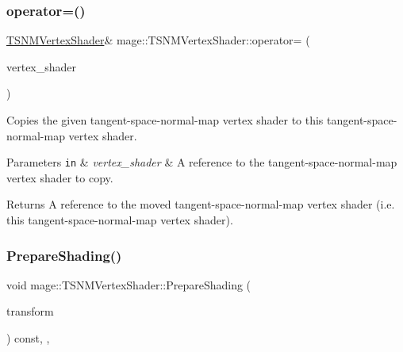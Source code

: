 \subsubsection{\texorpdfstring{operator=()}{operator=()}\hspace{0.1cm}{\footnotesize\ttfamily [2/2]}}
{\footnotesize\ttfamily \hyperlink{classmage_1_1_t_s_n_m_vertex_shader}{T\+S\+N\+M\+Vertex\+Shader}\& mage\+::\+T\+S\+N\+M\+Vertex\+Shader\+::operator= (\begin{DoxyParamCaption}\item[{\hyperlink{classmage_1_1_t_s_n_m_vertex_shader}{T\+S\+N\+M\+Vertex\+Shader} \&\&}]{vertex\+\_\+shader }\end{DoxyParamCaption})\hspace{0.3cm}{\ttfamily [delete]}}

Copies the given tangent-\/space-\/normal-\/map vertex shader to this tangent-\/space-\/normal-\/map vertex shader.


\begin{DoxyParams}[1]{Parameters}
\mbox{\tt in}  & {\em vertex\+\_\+shader} & A reference to the tangent-\/space-\/normal-\/map vertex shader to copy. \\
\hline
\end{DoxyParams}
\begin{DoxyReturn}{Returns}
A reference to the moved tangent-\/space-\/normal-\/map vertex shader (i.\+e. this tangent-\/space-\/normal-\/map vertex shader). 
\end{DoxyReturn}
\hypertarget{classmage_1_1_t_s_n_m_vertex_shader_ad9ee77f591466d7843bcd413e3d7093d}{}\label{classmage_1_1_t_s_n_m_vertex_shader_ad9ee77f591466d7843bcd413e3d7093d} 
\subsubsection{\texorpdfstring{Prepare\+Shading()}{PrepareShading()}}
{\footnotesize\ttfamily void mage\+::\+T\+S\+N\+M\+Vertex\+Shader\+::\+Prepare\+Shading (\begin{DoxyParamCaption}\item[{I\+D3\+D11\+Buffer $\ast$}]{transform }\end{DoxyParamCaption}) const\hspace{0.3cm}{\ttfamily [final]}, {\ttfamily [override]}, {\ttfamily [virtual]}}

